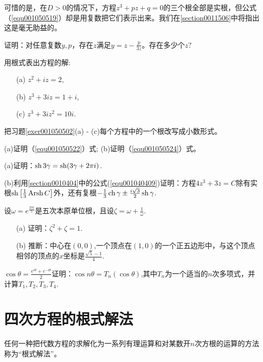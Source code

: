 可惜的是，在$D>0$的情况下，方程$z^3 +pz+q =0$的三个根全部是实根，但公式（\ref{equ001050519}）却是用复数把它们表示出来。我们在\ref{section0011506}中将指出这是毫无助益的。


\begin{problemset}
\item 证明：对任意复数$y,p$，存在$z$满足$y = z - \frac{p}{3z}$。存在多少个$z?$

\item\label{exer001050502} 用根式表出方程的解:
\begin{enumerate}
\item[(a)]$z^2+iz=2$,
\item[(b)]$z^3+3iz=1+i$,
\item[(c)]$z^3+3iz^2 = 10i$.
\end{enumerate}

\item 把习题\ref{exer001050502}(a) - (c)每个方程中的一个根改写成小数形式。

\item (a)证明（\ref{equ001050522}）式; \qquad (b)证明（\ref{equ001050524}）式。

\item (a)证明：$\operatorname{sh}{3\gamma} = \operatorname{sh}(3\gamma + 2\pi{}i)$.

(b)利用\ref{section0010404}中的公式(\ref{equ001040409})证明：方程$4z^3+3z = C$除有实根$\operatorname{sh}\left[\frac{1}{3}\operatorname{Arsh}{C}\right]$外，还有复根$-\frac{1}{3}\operatorname{ch}{\gamma} \pm \frac{i\sqrt{3}}{2}\operatorname{sh}{\gamma}$.

\item 设$\omega = e^{\frac{2\pi{}i}{5}}$是五次本原单位根，且设$\zeta = \omega + \frac{1}{\omega}$.
\begin{enumerate}
\item[(a)]证明：$\zeta^2 + \zeta=1$.
\item[(b)]推断：中心在$(0, 0)$,一个顶点在$(1,0)$的一个正五边形中，与这个顶点相邻的顶点的$x$坐标是$\frac{\sqrt{5}-1}{4}$.
\end{enumerate}

$\cos{\theta} = \frac{e^{i\theta} + e^{-i\theta}}{2}$证明：$\cos{n\theta} = T_n(\cos{\theta})$,其中$T_n$为一个适当的$n$次多项式，并计算$T_1, T_2, T_3, T_4$.

\end{problemset}



\section{四次方程的根式解法}\label{section0010506}
任何一种把代数方程的求解化为一系列有理运算和对某数开$n$次方根的运算的方法称为“根式解法”。

